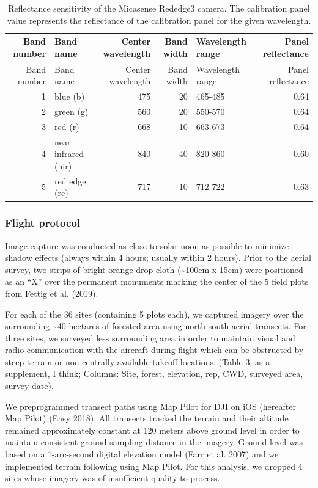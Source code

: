 \documentclass[]{article}
\begin{document}
\begin{longtable}[]{@{}rlrrlr@{}}
\caption{Reflectance sensitivity of the Micasense Rededge3 camera. The
calibration panel value represents the reflectance of the calibration
panel for the given wavelength.}\tabularnewline
\toprule
Band number & Band name & Center wavelength & Band width & Wavelength
range & Panel reflectance\tabularnewline
\midrule
\endfirsthead
\toprule
Band number & Band name & Center wavelength & Band width & Wavelength
range & Panel reflectance\tabularnewline
\midrule
\endhead
1 & blue (b) & 475 & 20 & 465-485 & 0.64\tabularnewline
2 & green (g) & 560 & 20 & 550-570 & 0.64\tabularnewline
3 & red (r) & 668 & 10 & 663-673 & 0.64\tabularnewline
4 & near infrared (nir) & 840 & 40 & 820-860 & 0.60\tabularnewline
5 & red edge (re) & 717 & 10 & 712-722 & 0.63\tabularnewline
\bottomrule
\end{longtable}

\subsubsection{Flight protocol}\label{flight-protocol}

Image capture was conducted as close to solar noon as possible to
minimize shadow effects (always within 4 hours; usually within 2 hours).
Prior to the aerial survey, two strips of bright orange drop cloth
(\textasciitilde{}100cm x 15cm) were positioned as an ``X'' over the
permanent monuments marking the center of the 5 field plots from Fettig
et al. (2019).

For each of the 36 sites (containing 5 plots each), we captured imagery
over the surrounding \textasciitilde{}40 hectares of forested area using
north-south aerial transects. For three sites, we surveyed less
surrounding area in order to maintain visual and radio communication
with the aircraft during flight which can be obstructed by steep terrain
or non-centrally available takeoff locations. (Table 3; as a supplement,
I think; Columns: Site, forest, elevation, rep, CWD, surveyed area,
survey date).

We preprogrammed transect paths using Map Pilot for DJI on iOS
(hereafter Map Pilot) (Easy 2018). All transects tracked the terrain and
their altitude remained approximately constant at 120 meters above
ground level in order to maintain consistent ground sampling distance in
the imagery. Ground level was based on a 1-arc-second digital elevation
model (Farr et al. 2007) and we implemented terrain following using Map
Pilot. For this analysis, we dropped 4 sites whose imagery was of
insufficient quality to process.
\end{document}
